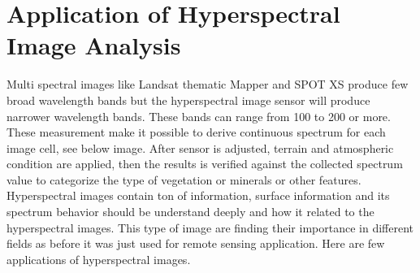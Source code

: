 \documentclass[document.tex]{subfiles}
\begin{document}
\section{Application of Hyperspectral Image Analysis}

Multi spectral images like Landsat thematic Mapper and SPOT XS produce few broad wavelength bands but the hyperspectral image sensor will produce narrower wavelength bands. These bands can range from 100 to 200 or more. These measurement make it possible to derive continuous spectrum for each image cell, see below image. After sensor is adjusted, terrain and atmospheric condition are applied, then the results is verified against the collected spectrum value to categorize the type of vegetation or minerals or other features. Hyperspectral images contain ton of information, surface information and its spectrum behavior should be understand deeply and how it related to the hyperspectral images. This type of image are finding their importance in different fields as before it was just used for remote sensing application. Here are few applications of hyperspectral images.
\end{document}
